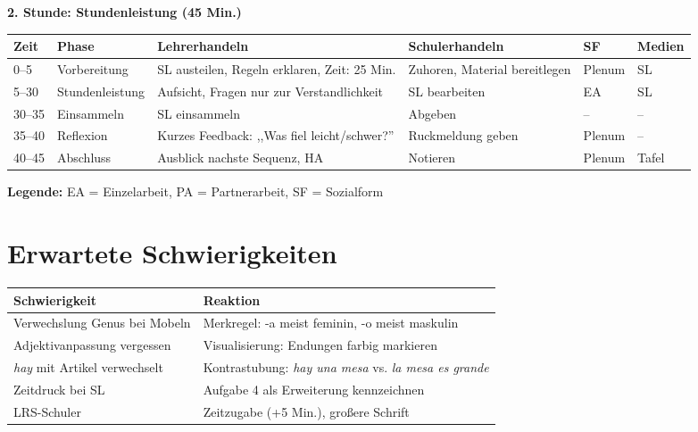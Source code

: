 \documentclass[11pt,a4paper]{article}
\begin{document}
\vspace{1em}

\textbf{2. Stunde: Stundenleistung (45 Min.)}

\begin{longtable}{|p{1cm}|p{1.5cm}|p{4cm}|p{3cm}|p{2cm}|p{2cm}|}
\hline
\textbf{Zeit} & \textbf{Phase} & \textbf{Lehrerhandeln} & \textbf{Schulerhandeln} & \textbf{SF} & \textbf{Medien} \\
\hline
\endhead

0--5 & Vorbe\-reitung & SL austeilen, Regeln erklaren, Zeit: 25 Min. & Zuhoren, Material bereitlegen & Plenum & SL \\
\hline

5--30 & Stunden\-leistung & Aufsicht, Fragen nur zur Verstandlichkeit & SL bearbeiten & EA & SL \\
\hline

30--35 & Ein\-sammeln & SL einsammeln & Abgeben & -- & -- \\
\hline

35--40 & Reflexion & Kurzes Feedback: ,,Was fiel leicht/schwer?'' & Ruckmeldung geben & Plenum & -- \\
\hline

40--45 & Abschluss & Ausblick nachste Sequenz, HA & Notieren & Plenum & Tafel \\
\hline
\end{longtable}

\textbf{Legende:} EA = Einzelarbeit, PA = Partnerarbeit, SF = Sozialform

\section{Erwartete Schwierigkeiten}

\begin{tabular}{|p{5cm}|p{8cm}|}
\hline
\textbf{Schwierigkeit} & \textbf{Reaktion} \\
\hline
Verwechslung Genus bei Mobeln & Merkregel: -a meist feminin, -o meist maskulin \\
\hline
Adjektivanpassung vergessen & Visualisierung: Endungen farbig markieren \\
\hline
\textit{hay} mit Artikel verwechselt & Kontrastubung: \textit{hay una mesa} vs. \textit{la mesa es grande} \\
\hline
Zeitdruck bei SL & Aufgabe 4 als Erweiterung kennzeichnen \\
\hline
LRS-Schuler & Zeitzugabe (+5 Min.), großere Schrift \\
\hline
\end{tabular}
\end{document}
